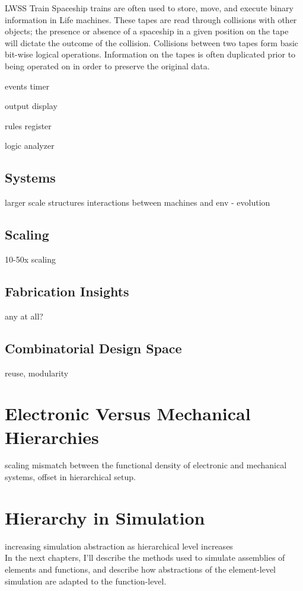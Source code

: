 {LWSS Train
Spaceship trains are often used to store, move, and execute binary information in Life machines.  These tapes are read through collisions with other objects; the presence or absence of a spaceship in a given position on the tape will dictate the outcome of the collision.  Collisions between two tapes form basic bit-wise logical operations.  Information on the tapes is often duplicated prior to being operated on in order to preserve the original data.

events timer

output display

rules register

logic analyzer

\subsection{Systems}

larger scale structures
interactions between machines and env - evolution

\subsection{Scaling}

10-50x scaling

\subsection{Fabrication Insights}

any at all?

\subsection{Combinatorial Design Space}

reuse, modularity

\section{Electronic Versus Mechanical Hierarchies}

scaling mismatch between the functional density of electronic and mechanical systems, offset in hierarchical setup.

\section{Hierarchy in Simulation}

increasing simulation abstraction as hierarchical level increases\\

In the next chapters, I'll describe the methods used to simulate assemblies of elements and functions, and describe how abstractions of the element-level simulation are adapted to the function-level.



}
